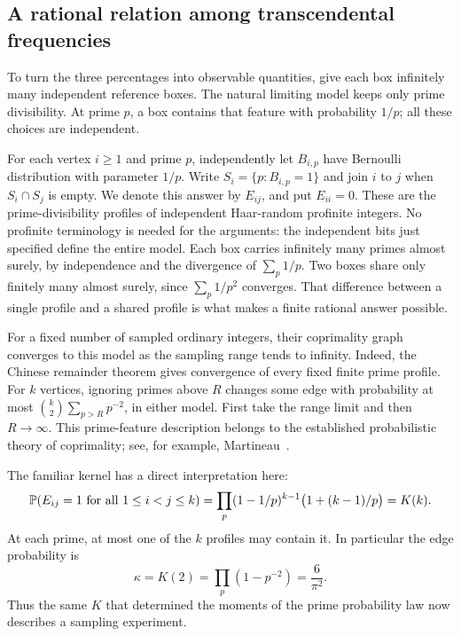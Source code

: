 \subsection{A rational relation among transcendental frequencies}

To turn the three percentages into observable quantities, give each box
infinitely many independent reference boxes. The natural limiting model
keeps only prime divisibility. At prime $p$, a box contains that feature
with probability $1/p$; all these choices are independent.

For each vertex $i\ge1$ and prime $p$, independently let
$B_{i,p}$ have Bernoulli distribution with parameter $1/p$. Write
$S_i=\{p:B_{i,p}=1\}$ and join $i$ to $j$ when $S_i\cap S_j$ is empty.
We denote this answer by $E_{ij}$, and put $E_{ii}=0$.
These are the prime-divisibility profiles of independent Haar-random
profinite integers. No profinite terminology is needed for the arguments:
the independent bits just specified define the entire model. Each box
carries infinitely many primes almost surely, by independence and the
divergence of $\sum_p1/p$. Two boxes share only finitely many almost
surely, since $\sum_p1/p^2$ converges. That difference between a single
profile and a shared profile is what makes a finite rational answer
possible.

For a fixed number of sampled ordinary integers, their coprimality graph
converges to this model as the sampling range tends to infinity. Indeed,
the Chinese remainder theorem gives convergence of every fixed finite
prime profile. For $k$ vertices, ignoring primes above $R$ changes some
edge with probability at most $\binom{k}{2}\sum_{p>R}p^{-2}$, in either
model. First take the range limit and then $R\to\infty$.
This prime-feature description belongs to the established probabilistic
theory of coprimality; see, for example, Martineau~\cite{RecMartineauVisibility2019}.

The familiar kernel has a direct interpretation here:
\begin{equation}\label{rec:clique-kernel}
 \mathbb P(E_{ij}=1\text{ for all }1\le i<j\le k)
 =\prod_p(1-1/p)^{k-1}\bigl(1+(k-1)/p\bigr)=K(k).
\end{equation}
At each prime, at most one of the $k$ profiles may contain it. In
particular the edge probability is
\begin{equation}\label{rec:kappa}
 \kappa=K(2)=\prod_p(1-p^{-2})=\frac6{\pi^2}.
\end{equation}
Thus the same $K$ that determined the moments of the prime probability
law now describes a sampling experiment.

